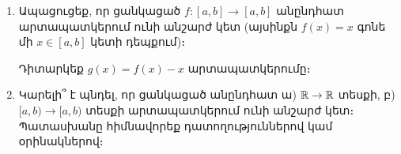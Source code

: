 \begin{enumerate}[label=\thesection.\arabic*.]
\item Ապացուցեք, որ ցանկացած $f: [a, b] \to [a, b]$ անընդհատ արտապատկերում ունի անշարժ կետ (այսինքն $f(x) = x$ գոնե մի $x \in [a, b]$ կետի դեպքում)։

\begin{hint}
Դիտարկեք $g(x) = f(x) - x$ արտապատկերումը։
\end{hint}

\item Կարելի՞ է պնդել, որ ցանկացած անընդհատ ա) $\mathbb{R} \to \mathbb{R}$ տեսքի, բ) $[a, b) \to [a, b)$ տեսքի արտապատկերում ունի անշարժ կետ։ Պատասխանը հիմնավորեք դատողություններով կամ օրինակներով։


\end{enumerate}

